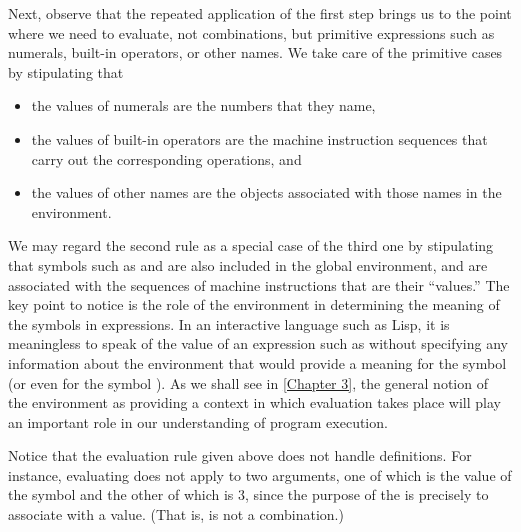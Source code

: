 Next, observe that the repeated application of the first step brings us to the point where we need to evaluate, not combinations, but primitive expressions such as numerals, built-in operators, or other names.
We take care of the primitive cases by stipulating that
\begin{itemize}

	\item
	the values of numerals are the numbers that they name,

	\item
	the values of built-in operators are the machine instruction sequences that
	carry out the corresponding operations, and

	\item
	the values of other names are the objects associated with those names in the
	environment.

\end{itemize}
We may regard the second rule as a special case of the third one by stipulating that symbols such as \code{+} and \code{*} are also included in the global environment, and are associated with the sequences of machine instructions that are their “values.”
The key point to notice is the role of the environment in determining the meaning of the symbols in expressions.
In an interactive language such as Lisp, it is meaningless to speak of the value of an expression such as  without specifying any information about the environment that would provide a meaning for the symbol  (or even for the symbol \code{+}).
As we shall see in \cref{Chapter 3}, the general notion of the environment as providing a context in which evaluation takes place will play an important role in our understanding of program execution.

Notice that the evaluation rule given above does not handle definitions.
For instance, evaluating  does not apply  to two arguments, one of which is the value of the symbol  and the other of which is \( 3 \), since the purpose of the  is precisely to associate  with a value.
(That is,  is not a combination.)

